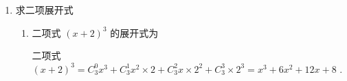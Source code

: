 \begin{enumerate}
\begin{enumerate}
\begin{jieda}
\begin{enumerate}
                \item 因 $A,B,C$ 都在内，所以只需从余下 5 人中选 2 人有 ${C}_{5}^{2}$ 种不同结果， $A,B$ 必须相邻，有 ${A}_{2}^{2}$ 种不同排法，由于 $C$ 与 $A$ ， $B$ 都不相邻，先将选出的 2 人进行全排列共有 ${A}_{2}^{2}$种不同排法,再将 $A\text{ 、 }B$ 这个整体与 $C$ 插入到选出的 2 人所产生的 3 各空位中有 ${A}_{3}^{2}$ 种不同排法,由乘法原理可得共有 ${C}_{5}^{2}{A}_{2}^{2}{A}_{2}^{2}{A}_{3}^{2} = {240}$ 种不同排法

                \item 分四类:
                
                第一类: 所选的 5 人无 $A$ 、 $B$ ，共有 ${A}_{6}^{5} = {720}$ 种排法;
                
                第二类: 所选的 5 人有 $A$ 、无 $B$ ，共有 ${C}_{6}^{4}{C}_{3}^{1}{A}_{4}^{4} = {1080}$ 种排法;
                
                第三类:所选的 5 人无 $A$ 、有 $B$ ，共有 ${C}_{6}^{4}{C}_{4}^{1}{A}_{4}^{4} = {1440}$ 种排法；
                
                第四类: 所选的 5 人有 $A\text{ 、 }B$ ,若 $A$ 排中间时,有 ${C}_{6}^{3}{A}_{4}^{4}$ 种排法,
                
                若 $A$ 不排中间时，有 ${C}_{6}^{3}{C}_{2}^{1}{C}_{3}^{1}{A}_{3}^{3}$ 种排法，共有 ${C}_{6}^{3}\left( {{A}_{4}^{4} + {C}_{2}^{1}{C}_{3}^{1}{A}_{3}^{3}}\right)  = {1200}$ 种排法；
                
                综上, 共有 4440 种不同排法.
            \end{enumerate}
        \end{jieda}
    \end{enumerate}

    \item 求二项展开式
    \begin{enumerate}
        \item 二项式 ${\left( x + 2\right) }^{3}$ 的展开式为
        \begin{jieda}
            二项式 ${\left( x + 2\right) }^{3} = {{C}}_{3}^{0}{x}^{3} + {{C}}_{3}^{1}{x}^{2} \times  2 + {{C}}_{3}^{2}x \times  {2}^{2} + {{C}}_{3}^{3} \times  {2}^{3} = {x}^{3} + 6{x}^{2} + {12x} + 8$ .
        \end{jieda}
        

\end{enumerate}
\end{enumerate}
